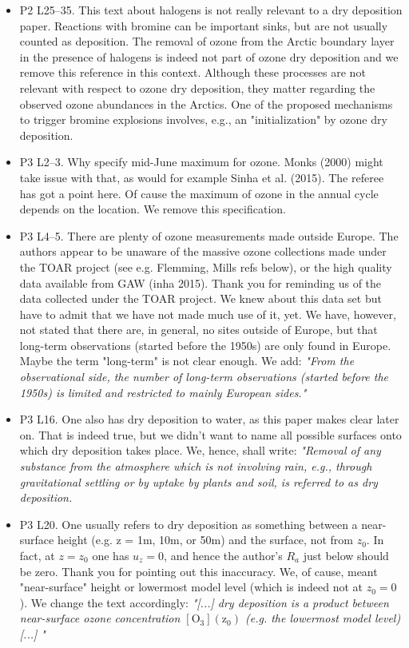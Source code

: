 \begin{itemize}
\item {\color{blue}P2 L25--35. This text about halogens is not really relevant to a dry deposition
paper. Reactions with bromine can be important sinks, but are not usually counted
as deposition.}
  The removal of ozone from the Arctic boundary layer in the presence of halogens is indeed not part of ozone dry deposition and we remove this reference in this context.
Although these processes are not relevant with respect to ozone dry deposition, they matter regarding the observed ozone abundances in the Arctics. One of the proposed mechanisms to trigger bromine explosions involves, e.g., an "initialization" by ozone dry deposition.  
\item {\color{blue}P3 L2--3. Why specify mid-June maximum for ozone. Monks (2000) might
  take issue with that, as would for example Sinha et al. (2015).}
  The referee has got a point here. Of cause the maximum of ozone in the annual cycle depends on the location. We remove this specification.
\item {\color{blue}P3 L4--5. There are plenty of ozone measurements made outside Europe. The
authors appear to be unaware of the massive ozone collections made under the
TOAR project (see e.g. Flemming, Mills refs below), or the high quality data
available from GAW (inha 2015).}
  Thank you for reminding us of the data collected under the TOAR project. We knew about this data set but have to admit that we have not made much use of it, yet. We have, however, not stated that there are, in general, no sites outside of Europe, but that long-term observations (started before the 1950s) are only found in Europe. Maybe the term "long-term" is not clear enough. We add: \emph{"From the observational side, the number of long-term observations (started before the 1950s) is limited and restricted to mainly European sides."}
  
\item {\color{blue}P3 L16. One also has dry deposition to water, as this paper makes clear later on.}
  That is indeed true, but we didn't want to name all possible surfaces onto which dry deposition takes place. We, hence, shall write: \emph{"Removal of any substance from the atmosphere which is not involving rain, e.g., through gravitational settling or by uptake by plants and soil, is referred to as dry deposition.}
  
\item {\color{blue}P3 L20. One usually refers to dry deposition as something between a near-
surface height (e.g. z = 1m, 10m, or 50m) and the surface, not from $z_0$. In fact,
at $z = z_0$ one has $u_z = 0$, and hence the author’s $R_a$ just below should be zero.}
Thank you for pointing out this inaccuracy. We, of cause, meant "near-surface" height or lowermost model level (which is indeed not at $z_0=0$). We change the text accordingly: \emph{"[...] dry deposition is a product between near-surface ozone concentration $\mathrm{[O_3](z_0)}$ (e.g. the lowermost model level) [...] "}
  

\end{itemize}
